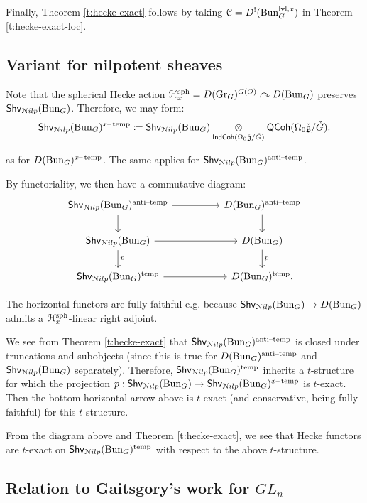 \documentclass[reqno,11pt]{amsart}
\numberwithin{equation}{subsection}
\theoremstyle{remark}
\newcommand{\sC}{{\EuScript C}}
\newcommand{\sH}{{\EuScript H}}
\newcommand{\sN}{{\EuScript N}}
\newcommand{\fg}{{\mathfrak g}}
\newcommand{\on}{\operatorname}
\newcommand{\mathendash}{\text{\textendash}}
\newcommand{\actson}{\curvearrowright}
\newcommand{\Gr}{\on{Gr}}
\newcommand{\Bun}{\on{Bun}}
\newcommand{\IndCoh}{\mathsf{IndCoh}}
\newcommand{\QCoh}{\mathsf{QCoh}}
\newcommand{\Shv}{\mathsf{Shv}}
\newcommand{\temp}{\on{temp}}
\newcommand{\at}{\on{anti}\!\mathendash\!\on{temp}}
\newcommand{\xtemp}{x\mathendash\on{temp}}
\newcommand{\Nilp}{\sN ilp}
\newcommand{\xlevel}{\on{lvl},x}
\begin{document}
Finally, Theorem \ref{t:hecke-exact} follows by taking 
$\sC = D^!(\Bun_G^{\xlevel})$ in Theorem \ref{t:hecke-exact-loc}.

\subsection{Variant for nilpotent sheaves}\label{ss:hecke-exact-nilp}

Note that the spherical Hecke action $\sH_x^{\on{sph}} = D(\Gr_G)^{G(O)} 
\actson D(\Bun_G)$
preserves $\Shv_{\Nilp}(\Bun_G)$. Therefore, we may form:
%
\[
\Shv_{\Nilp}(\Bun_G)^{\xtemp} \coloneqq 
\Shv_{\Nilp}(\Bun_G) \underset{\IndCoh(\Omega_0\check{\fg}/\check{G})}{\otimes}
\QCoh(\Omega_0\check{\fg}/\check{G}). 
\]

\noindent as for $D(\Bun_G)^{\xtemp}$. The same applies for 
$\Shv_{\Nilp}(\Bun_G)^{\at}$.

By functoriality, we then have a commutative diagram:
%
\[
\begin{tikzcd}
\Shv_{\Nilp}(\Bun_G)^{\at}
\arrow[rr]
\arrow[d]
&&
D(\Bun_G)^{\at} 
\arrow[d]
\\
\Shv_{\Nilp}(\Bun_G)
\arrow[rr]
\arrow[d,"p"]
&&
D(\Bun_G)
\arrow[d,"p"]
\\
\Shv_{\Nilp}(\Bun_G)^{\temp}
\arrow[rr]
&&
D(\Bun_G)^{\temp}.
\end{tikzcd}
\]

\noindent The horizontal functors are fully faithful e.g. 
because $\Shv_{\Nilp}(\Bun_G) \to D(\Bun_G)$ admits a 
$\sH_x^{\on{sph}}$-linear right adjoint.

We see from Theorem \ref{t:hecke-exact} that $\Shv_{\Nilp}(\Bun_G)^{\at}$
is closed under truncations and subobjects (since this is 
true for $D(\Bun_G)^{\at}$ and $\Shv_{\Nilp}(\Bun_G)$ separately).
Therefore, $\Shv_{\Nilp}(\Bun_G)^{\temp}$ inherits a $t$-structure
for which the projection $p:\Shv_{\Nilp}(\Bun_G) \to \Shv_{\Nilp}(\Bun_G)^{\xtemp}$
is $t$-exact. Then the bottom horizontal arrow above is $t$-exact
(and conservative, being fully faithful) for this $t$-structure.  

From the diagram above and Theorem \ref{t:hecke-exact}, 
we see that Hecke functors are $t$-exact on $\Shv_{\Nilp}(\Bun_G)^{\temp}$
with respect to the above $t$-structure.

\subsection{Relation to Gaitsgory's work for $GL_n$}\label{ss:vanishing}
\end{document}
